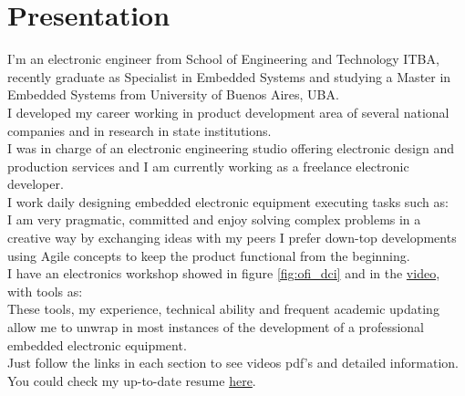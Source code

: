 \section{Presentation}
I'm an electronic engineer from School of Engineering and Technology ITBA,
recently graduate as Specialist in Embedded Systems and studying a
Master in Embedded Systems from University of Buenos Aires, UBA.\\
I developed my career working in product development area of several
national companies and in research in state institutions.\\
I was in charge of an electronic engineering studio offering electronic design
and production services and I am currently working as a freelance electronic
developer. \\ %
I work daily designing embedded electronic equipment executing tasks such as: \\
I am very pragmatic, committed and enjoy solving complex problems in a creative way by exchanging ideas
with my peers I prefer down-top developments using Agile concepts to keep the product functional from
the beginning.\\
I have an electronics workshop showed in figure \ref{fig:ofi_dci} and in the \href{\linkofidci}{video}, with tools as:\\
These tools, my experience, technical ability and frequent academic updating allow me to unwrap
in most instances of the development of a professional embedded electronic equipment.\\
Just follow the links in each section to see videos pdf's and detailed information.\\
You could check my up-to-date resume \href{\linkgithubcvpdf}{here}.\\

